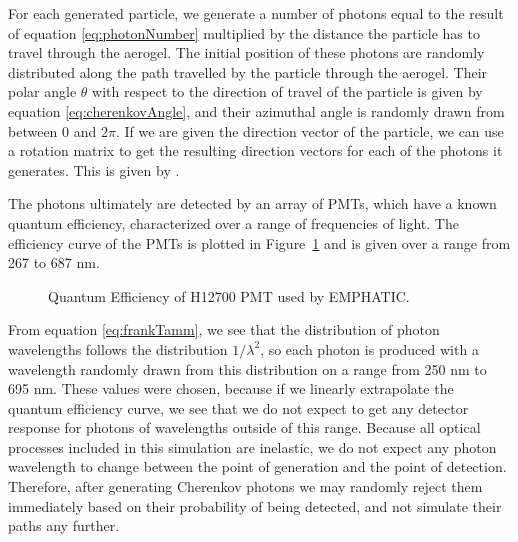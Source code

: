 For each generated particle, we generate a number of photons equal to the result of equation \ref{eq:photonNumber} multiplied by the distance the particle has to travel through the aerogel.
The initial position of these photons are randomly distributed along the path travelled by the particle through the aerogel.
Their polar angle $\theta$ with respect to the direction of travel of the particle is given by equation \ref{eq:cherenkovAngle}, and their azimuthal angle is randomly drawn from between 0 and $2\pi$.
If we are given the direction vector of the particle, we can use a rotation matrix to get the resulting direction vectors for each of the photons it generates.
This is given by .

The photons ultimately are detected by an array of PMTs, which have a known quantum efficiency, characterized over a range of frequencies of light.
The efficiency curve of the PMTs is plotted in  Figure\ \ref{fig:qEff} and is given over a range from 267 to 687 nm.

\begin{figure}[]
\centering
{}
\caption[Quantum Efficiency of H12700 PMT used by EMPHATIC.]{Quantum Efficiency of H12700 PMT used by EMPHATIC.}
\label{fig:qEff} 
\end{figure}

From equation \ref{eq:frankTamm}, we see that the distribution of photon wavelengths follows the distribution $1/\lambda^2$, so each photon is produced with a wavelength randomly drawn from this distribution on a range from 250 nm to 695 nm.
These values were chosen, because if we linearly extrapolate the quantum efficiency curve, we see that we do not expect to get any detector response for photons of wavelengths outside of this range.
Because all optical processes included in this simulation are inelastic, we do not expect any photon wavelength to change between the point of generation and the point of detection.
Therefore, after generating Cherenkov photons we may randomly reject them immediately based on their probability of being detected, and not simulate their paths any further.


